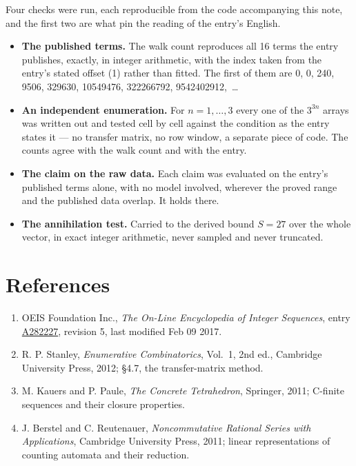 \documentclass[11pt]{article}
\theoremstyle{definition}
\begin{document}
Four checks were run, each reproducible from the code accompanying this note, and the first two are what pin the reading of the entry's English.

\begin{itemize}

\item {\bfseries The published terms.} The walk count reproduces all 16 terms the entry publishes, exactly, in integer arithmetic, with the index taken from the entry's stated offset (1) rather than fitted. The first of them are 0, 0, 240, 9506, 329630, 10549476, 322266792, 9542402912,~\dots

\item {\bfseries An independent enumeration.} For $n = 1,\dots,3$ every one of the $3^{3n}$ arrays was written out and tested cell by cell against the condition as the entry states it --- no transfer matrix, no row window, a separate piece of code. The counts agree with the walk count and with the entry.

\item {\bfseries The claim on the raw data.} Each claim was evaluated on the entry's published terms alone, with no model involved, wherever the proved range and the published data overlap. It holds there.

\item {\bfseries The annihilation test.} Carried to the derived bound $S = 27$ over the whole vector, in exact integer arithmetic, never sampled and never truncated.

\end{itemize}

\section{References}

\begin{enumerate}

\item OEIS Foundation Inc., \emph{The On-Line Encyclopedia of Integer Sequences}, entry \href{https://oeis.org/A282227}{A282227}, revision 5, last modified Feb 09 2017.

\item R. P. Stanley, \emph{Enumerative Combinatorics}, Vol.~1, 2nd ed., Cambridge University Press, 2012; \S4.7, the transfer-matrix method.

\item M. Kauers and P. Paule, \emph{The Concrete Tetrahedron}, Springer, 2011; C-finite sequences and their closure properties.

\item J. Berstel and C. Reutenauer, \emph{Noncommutative Rational Series with Applications}, Cambridge University Press, 2011; linear representations of counting automata and their reduction.

\end{enumerate}
\end{document}
